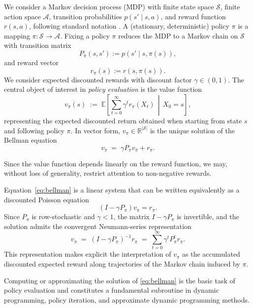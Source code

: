\documentclass[letterpaper, 10 pt, conference]{ieeeconf}
\begin{document}
We consider a Markov decision process (MDP) with finite state space $\mathcal{S}$,
finite action space $\mathscr{A}$, transition probabilities
$p(s' \mid s,a)$, and reward function $r(s,a)$, following standard notation \cite{puterman2014markov,barto2021reinforcement}.  
A (stationary, deterministic) policy $\pi$ is a mapping
$\pi:\mathcal{S}\to\mathscr{A}$.
Fixing a policy $\pi$ reduces the MDP to a Markov chain on $\mathcal{S}$ with
transition matrix
$$
P_\pi(s,s') := p(s' \mid s, \pi(s)),
$$
and reward vector
$$
r_\pi(s) := r(s,\pi(s)).
$$
We consider expected discounted rewards with discount factor $\gamma\in(0,1)$.
The central object of interest in \emph{policy evaluation} \cite{puterman2014markov} is the value function
\begin{equation}
\label{eq:vf_def}
v_\pi(s)
\;:=\;
\mathbb{E}\left[
\sum_{t=0}^{\infty} \gamma^t r_\pi(X_t)
\,\middle|\,
X_0=s
\right],
\end{equation}
representing the expected discounted return obtained when starting from state
$s$ and following policy $\pi$.
In vector form, $v_\pi\in\mathbb{R}^{|\mathcal{S}|}$ is the unique solution of the
Bellman equation
\begin{equation}
\label{eq:bellman}
v_\pi \;=\; \gamma P_\pi v_\pi + r_\pi .
\end{equation}

Since the value function depends linearly on the reward function, we may,
without loss of generality, restrict attention to non-negative rewards.


Equation~\eqref{eq:bellman} is a linear system that can be written equivalently as
a discounted Poisson equation
\begin{equation}
\label{eq:poisson}
(I - \gamma P_\pi) v_\pi = r_\pi .
\end{equation}
Since $P_\pi$ is row-stochastic and $\gamma<1$, the matrix
$I-\gamma P_\pi$ is invertible, and the solution admits the convergent
Neumann-series representation
\[
v_\pi
\;=\;
(I-\gamma P_\pi)^{-1} r_\pi
\;=\;
\sum_{t=0}^{\infty} \gamma^t P_\pi^t r_\pi .
\]
This representation makes explicit the interpretation of $v_\pi$ as the
accumulated discounted expected reward along trajectories of the Markov chain induced by
$\pi$.

Computing or approximating the solution of \eqref{eq:bellman} is the basic task
of policy evaluation and constitutes a fundamental subroutine in dynamic
programming, policy iteration, and approximate dynamic programming methods. 
\end{document}
